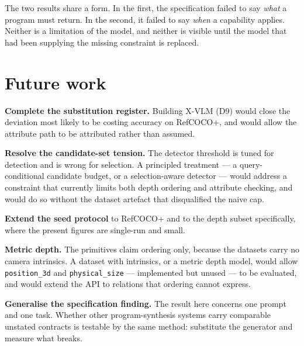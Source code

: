 \documentclass[12pt,a4paper,oneside]{report}
\begin{document}
The two results share a form. In the first, the specification failed to say \emph{what} a
program must return. In the second, it failed to say \emph{when} a capability applies.
Neither is a limitation of the model, and neither is visible until the model that had been
supplying the missing constraint is replaced.

\section{Future work}

\textbf{Complete the substitution register.} Building X-VLM (D9) would close the deviation
most likely to be costing accuracy on RefCOCO+, and would allow the attribute path to be
attributed rather than assumed.

\textbf{Resolve the candidate-set tension.} The detector threshold is tuned for detection
and is wrong for selection. A principled treatment --- a query-conditional candidate
budget, or a selection-aware detector --- would address a constraint that currently limits
both depth ordering and attribute checking, and would do so without the dataset artefact
that disqualified the naive cap.

\textbf{Extend the seed protocol} to RefCOCO+ and to the depth subset specifically, where
the present figures are single-run and small.

\textbf{Metric depth.} The primitives claim ordering only, because the datasets carry no
camera intrinsics. A dataset with intrinsics, or a metric depth model, would allow
\texttt{position\_3d} and \texttt{physical\_size} --- implemented but unused --- to be
evaluated, and would extend the API to relations that ordering cannot express.

\textbf{Generalise the specification finding.} The result here concerns one prompt and one
task. Whether other program-synthesis systems carry comparable unstated contracts is
testable by the same method: substitute the generator and measure what breaks.



\end{document}
